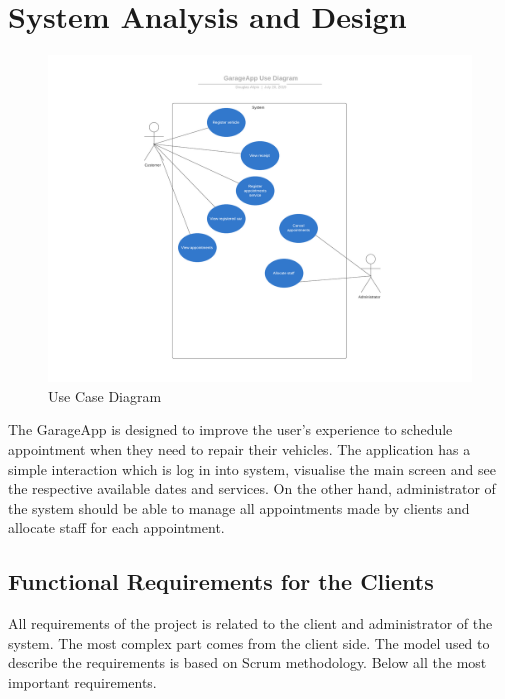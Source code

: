 \chapter{System Analysis and Design}


\begin{figure}
  \includegraphics[width=\linewidth]{use_case_diagram.png}
  \caption{Use Case Diagram}
  \label{fig:diagram}
\end{figure}

The GarageApp is designed  to improve the user's experience to schedule appointment when they need to repair their vehicles. The application has a simple interaction which is log in into system, visualise the main screen and see the respective available dates and services. On the other hand, administrator of the system should be able to manage all appointments made by clients and allocate staff for each appointment.

\section{Functional Requirements for the Clients}

All requirements of the project is related to the client and administrator of the system. The most complex part comes from the client side. The model used to describe the requirements is based on Scrum methodology. Below all the most important requirements.

